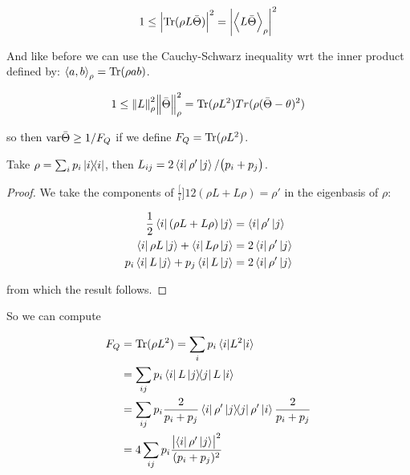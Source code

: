 \documentclass[main.tex]{subfiles}
\begin{document}
\begin{equation}
  1 \leq \abs{\operatorname*{Tr} (\rho L \bar{\Theta})}^{2} = \abs{\expval{L \bar\Theta}_{\rho} }^{2}
\end{equation}

And like before we can use the Cauchy-Schwarz inequality wrt the inner product defined by: \(\expval{a, b}_\rho = \operatorname*{Tr} (\rho ab) \).

\begin{equation}
  1 \leq \norm{L}^{2} _{\rho}  \norm{\bar{\Theta}}^{2} _{\rho}
  = \operatorname*{Tr} (\rho L^2 ) Tr(\rho (\bar\Theta - \theta)^2)
\end{equation}

so then \( \text{var}{\bar\Theta} \geq 1/F_Q \) if we define \(F_Q = \operatorname*{Tr} (\rho L^2)\).

\begin{claim}
Take \( \rho = \sum_i p_i \ketbra{i} \), then \( L _{ij} = 2\bra{i}\rho' \ket{j}/\qty(p_i + p_j) \).
\end{claim}

\begin{bluebox}
  \begin{proof}
      We take the components of \(\frac[i]{1}{2} (\rho L + L \rho) = \rho' \) in the eigenbasis of \(\rho\):

      \begin{subequations}
      \begin{align}
        \frac{1}{2} \bra{i} \qty(\rho L + L \rho) \ket{j}  &= \bra{i} \rho' \ket{j}  \\
         \bra{i} \rho L \ket{j} + \bra{i} L \rho \ket{j} &= 2  \bra{i} \rho' \ket{j} \\
         p_i \bra{i} L \ket{j} + p_j \bra{i} L \ket{j} &= 2  \bra{i} \rho' \ket{j}
      \end{align}
      \end{subequations}

      from which the result follows.
  \end{proof}
\end{bluebox}

So we can compute

\begin{align}
  F_Q &= \Tr(\rho L^2) = \sum_i p_i \ev{L^2}{i}  \\
  &= \sum _{ij} p_i \bra{i} L \ketbra{j} L \ket{i}  \\
  &= \sum _{ij} p_i \frac{2}{p_i + p_j} \bra{i} \rho' \ketbra{j} \rho' \ket{i} \frac{2}{p_i + p_j}  \\
  &= 4 \sum _{ij} p_i\frac{\abs{\bra{i} \rho' \ket{j}}^2 }{(p_i + p_j)^2}
\end{align}
\end{document}

